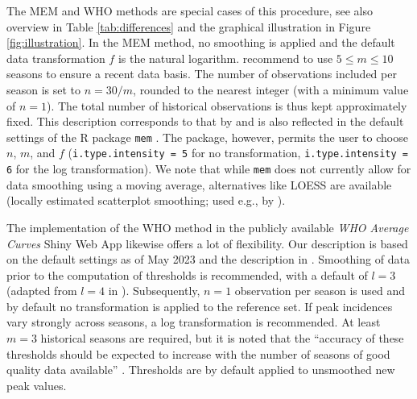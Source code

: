 \documentclass[12pt]{article}
\begin{document}
\noindent The MEM and WHO methods are special cases of this procedure, see also overview in Table \ref{tab:differences} and the graphical illustration in Figure \ref{fig:illustration}. In the MEM method, no smoothing is applied and the default data transformation $f$ is the natural logarithm.  \cite{Vega2015} recommend to use $5 \leq m \leq 10$ seasons to ensure a recent data basis. The number of observations included per season is set to $n = 30/m$, rounded to the nearest integer (with a minimum value of $n = 1$). The total number of historical observations is thus kept approximately fixed. This description corresponds to that by \cite{Vega2015} and is also reflected in the default settings of the R package \texttt{mem} \citep{Lozano2020}. The package, however, permits the user to choose $n$, $m$, and $f$ (\texttt{i.type.intensity	= 5} for no transformation, \texttt{i.type.intensity = 6} for the log transformation). We note that while \texttt{mem} does not currently allow for data smoothing using a moving average, alternatives like LOESS are available (locally estimated scatterplot smoothing; used e.g., by \citealt{Wang2023}). %

The implementation of the WHO method in the publicly available \textit{WHO Average Curves} Shiny Web App \citep{WHO2023} likewise offers a lot of flexibility. Our description is based on the default settings as of May 2023 and the description in \cite{WHO2014}. Smoothing of data prior to the computation of thresholds is recommended, with a default of $l = 3$ (adapted from $l = 4$ in \citealt[p68]{WHO2014}). Subsequently, $n = 1$ observation per season is used and by default no transformation is applied to the reference set. If peak incidences vary strongly across seasons, a log transformation is recommended. At least $m = 3$ historical seasons are required, but it is noted that the ``accuracy of these thresholds should be expected to increase with the number of seasons of good quality data available'' \cite[p22]{WHO2023}. Thresholds are by default applied to unsmoothed new peak values.
\end{document}
